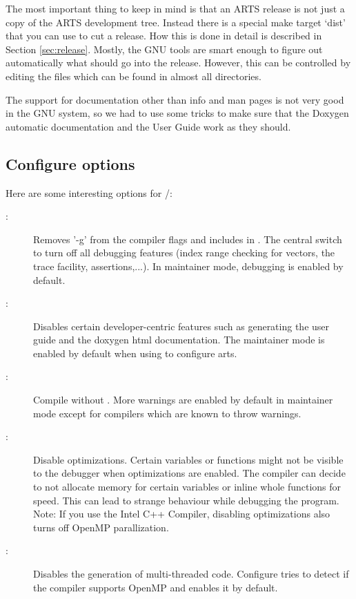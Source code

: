 The most important thing to keep in mind is that an ARTS release
is not just a copy of the ARTS development tree. Instead there is a
special make target `dist' that you can use to cut a release. How this
is done in detail is described in Section \ref{sec:release}. Mostly,
the GNU tools are smart enough to figure out automatically what should
go into the release. However, this can be controlled by editing the
 files which can be found in almost all directories.

The support for documentation other than info and man pages is not
very good in the GNU system, so we had to use some tricks to make sure
that the Doxygen automatic documentation and the User Guide work as they
should. 

\subsection{Configure options}

Here are some interesting options for /:

\begin{description}
\item[:] Removes '-g' from the compiler flags and includes  in
.  The central switch to turn off all debugging
features (index range checking for vectors, the trace facility,
assertions,...). In maintainer mode, debugging is enabled by default.

\item[:] 
Disables certain developer-centric features such as generating the user guide and the doxygen html documentation. The maintainer mode is enabled by default when using  to configure arts.

\item[:] 
Compile without . More warnings are enabled by default in maintainer mode except for compilers which are known to throw warnings.

\item[:]
Disable optimizations. Certain variables or functions might not be visible to the debugger when optimizations are enabled. The compiler can decide to not allocate memory for certain variables or inline whole functions for speed. This can lead to strange behaviour while debugging the program. Note: If you use the Intel C++ Compiler, disabling optimizations also turns off OpenMP parallization.

\item[:] 
Disables the generation of multi-threaded code. Configure tries to detect if the compiler supports OpenMP and enables it by default.

\end{description}


